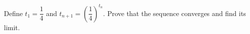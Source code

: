 Define $t_1=\dfrac{1}{4}$ and $t_{n+1}=(\dfrac{1}{4})^{t_n}$. Prove that the sequence converges and find its limit.
